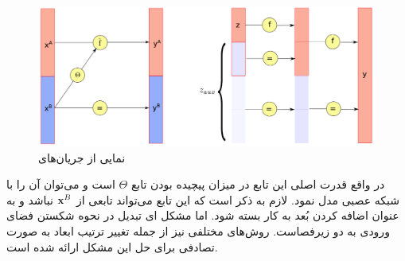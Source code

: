 \begin{figure}[H]
	\centering
	\includegraphics[width=.7\textwidth]{images/flow-survey1.png}
	\caption{
        نمایی از جریان‌های \coupling{}
	}
\label{fig:chap2:flow_coupling}
\end{figure}

در واقع قدرت اصلی این تابع در میزان پیچیده بودن تابع $\Theta$ است و می‌توان آن را با شبکه عصبی مدل نمود. لازم به ذکر است که این تابع می‌تواند تابعی از ${\bf x}^B$ نباشد و به عنوان اضافه کردن بُعد به کار بسته شود. اما مشکل ای تبدیل در نحوه شکستن فضای ورودی به دو زیرفصاست. روش‌های مختلفی نیز از جمله تغییر ترتیب ابعاد به صورت تصادفی برای حل این مشکل ارائه شده است.
